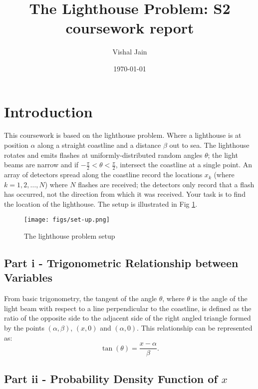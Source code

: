 \documentclass[11pt]{article}
\title{The Lighthouse Problem: S2 coursework report}
\author{Vishal Jain}
\date{\today}
\begin{document}
\maketitle

\tableofcontents

\newpage

\section{Introduction}
This coursework is based on the lighthouse problem. Where a lighthouse is at position \( \alpha \) along a straight coastline and a distance \( \beta \) out to sea. The lighthouse rotates and emits flashes at uniformly-distributed random angles \( \theta \); the light beams are narrow and if \( -\frac{\pi}{2} < \theta < \frac{\pi}{2} \), intersect the coastline at a single point. An array of detectors spread along the coastline record the locations \( x_k \) (where \( k = 1, 2, \ldots, N \)) where \( N \) flashes are received; the detectors only record that a flash has occurred, not the direction from which it was received. Your task is to find the location of the lighthouse. The setup is illustrated in Fig \ref{fig:setup}.

\begin{figure}[H]
    \centering
    \texttt{[image: figs/set-up.png]}
    \caption{The lighthouse problem setup}
    \label{fig:setup}
\end{figure}


\subsection{Part i - Trigonometric Relationship between Variables}

From basic trigonometry, the tangent of the angle \( \theta \), where \( \theta \) is the angle of the light beam with respect to a line perpendicular to the coastline, is defined as the ratio of the opposite side to the adjacent side of the right angled triangle formed by the points $(\alpha,\beta)$, $(x,0)$ and $(\alpha,0)$. This relationship can be represented as:
\[
\tan(\theta) = \frac{x-\alpha}{\beta}.
\]

\subsection{Part ii - Probability Density Function of \( x \)}
\end{document}
